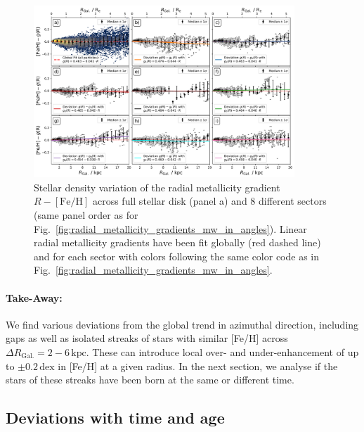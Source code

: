 \documentclass[fleqn,usenatbib]{mnras}
\begin{document}
\begin{figure}
    \centering
    \includegraphics[width=0.875\textwidth]{figures/linear_radial_metallicity_gradients_mw_in_angles.png}
    \caption{Stellar density variation of the radial metallicity gradient $R-\mathrm{[Fe/H]}$ across full stellar disk (panel a) and 8 different sectors (same panel order as for Fig.~\ref{fig:radial_metallicity_gradients_mw_in_angles}). Linear radial metallicity gradients have been fit globally (red dashed line) and for each sector with colors following the same color code as in Fig.~\ref{fig:radial_metallicity_gradients_mw_in_angles}.}    \label{fig:linear_radial_metallicity_gradients_mw_in_angles}
\end{figure}

\paragraph*{Take-Away:} We find various deviations from the global trend in azimuthal direction, including gaps as well as isolated streaks of stars with similar [Fe/H] across $\Delta R_\mathrm{Gal.} = 2-6\,\mathrm{kpc}$. These can introduce local over- and under-enhancement of up to $\pm 0.2\,\mathrm{dex}$ in [Fe/H] at a given radius. In the next section, we analyse if the stars of these streaks have been born at the same or different time.

\subsection{Deviations with time and age}
\label{sec:coherence_age_radial_metallicity_gradients}
\end{document}
